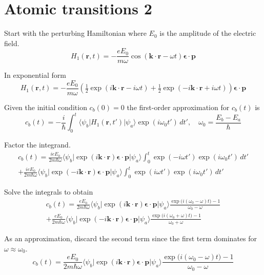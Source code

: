 

\section*{Atomic transitions 2}

Start with the perturbing Hamiltonian where $E_0$ is the amplitude of the electric field.
\begin{equation*}
H_1(\mathbf r,t)=-\frac{eE_0}{m\omega}
\cos(\mathbf k\cdot\mathbf r-\omega t)
\boldsymbol{\epsilon}\cdot\mathbf p
\end{equation*}

In exponential form
\begin{equation*}
H_1(\mathbf r,t)=-\frac{eE_0}{m\omega}
\left(\tfrac{1}{2}\exp(i\mathbf k\cdot\mathbf r-i\omega t)
+\tfrac{1}{2}\exp(-i\mathbf k\cdot\mathbf r+i\omega t)\right)
\boldsymbol{\epsilon}\cdot\mathbf p
\end{equation*}

Given the initial condition $c_b(0)=0$ the first-order approximation for $c_b(t)$ is
\begin{equation*}
c_b(t)=-\frac{i}{\hbar}\int_0^t
\langle\psi_b|H_1(\mathbf r,t')|\psi_a\rangle\exp(i\omega_0t')\,dt',\quad
\omega_0=\frac{E_b-E_a}{\hbar}
\end{equation*}

Factor the integrand.
\begin{multline*}
c_b(t)
=\frac{ieE_0}{2m\hbar\omega}
\langle\psi_b|\exp(i\mathbf k\cdot\mathbf r)\boldsymbol{\epsilon}\cdot\mathbf p|\psi_a\rangle
\int_0^t\exp(-i\omega t')\exp(i\omega_0t')\,dt'
\\
+\frac{ieE_0}{2m\hbar\omega}
\langle\psi_b|\exp(-i\mathbf k\cdot\mathbf r)\boldsymbol{\epsilon}\cdot\mathbf p|\psi_a\rangle
\int_0^t\exp(i\omega t')\exp(i\omega_0t')\,dt'
\end{multline*}

Solve the integrals to obtain
\begin{multline*}
c_b(t)=\frac{eE_0}{2m\hbar\omega}
\langle\psi_b|\exp(i\mathbf k\cdot\mathbf r)\boldsymbol{\epsilon}\cdot\mathbf p|\psi_a\rangle
\frac{\exp\bigl(i(\omega_0-\omega)t\bigr)-1}{\omega_0-\omega}
\\
+\frac{eE_0}{2m\hbar\omega}
\langle\psi_b|\exp(-i\mathbf k\cdot\mathbf r)\boldsymbol{\epsilon}\cdot\mathbf p|\psi_a\rangle
\frac{\exp\bigl(i(\omega_0+\omega)t\bigr)-1}{\omega_0+\omega}
\tag{1}
\end{multline*}

As an approximation, discard the second term since the first term
dominates for $\omega\approx\omega_0$.
\begin{equation*}
c_b(t)=\frac{eE_0}{2m\hbar\omega}
\langle\psi_b|\exp(i\mathbf k\cdot\mathbf r)\boldsymbol{\epsilon}\cdot\mathbf p|\psi_a\rangle
\frac{\exp\bigl(i(\omega_0-\omega)t\bigr)-1}{\omega_0-\omega}
\end{equation*}

